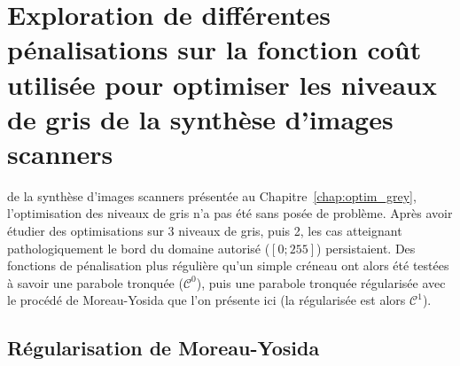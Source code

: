 \documentclass[main.tex]{subfiles}
\begin{document}
\chapter{Exploration de différentes pénalisations sur la fonction coût utilisée pour optimiser les niveaux de gris de la synthèse d'images scanners \label{chap:anx_penalisation} }

 de la synthèse d'images scanners présentée au Chapitre~\ref{chap:optim_grey}, l'optimisation des niveaux de gris n'a pas été sans posée  de problème. Après avoir étudier des optimisations sur 3 niveaux de gris, puis 2, les cas atteignant pathologiquement le bord du domaine autorisé ($[0;255]$) persistaient. Des fonctions de pénalisation plus régulière qu'un simple créneau ont alors été testées à savoir une parabole tronquée ($\mathcal{C}^0$), puis une parabole tronquée régularisée avec le procédé de Moreau-Yosida que l'on présente ici (la régularisée est alors $\mathcal{C}^1$).

\section{Régularisation de Moreau-Yosida}
\end{document}
